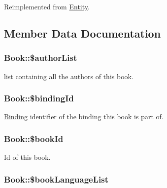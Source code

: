 Reimplemented from \hyperlink{classEntity_a48cdc3830bf695078a69a56f23e1b874}{Entity}.



\subsection{Member Data Documentation}
\hypertarget{classBook_a805fd463f7a6a7c370bd0d8aa87917e3}{
\subsubsection[{\$authorList}]{\setlength{\rightskip}{0pt plus 5cm}Book::\$authorList}}
\label{classBook_a805fd463f7a6a7c370bd0d8aa87917e3}
list containing all the authors of this book. \hypertarget{classBook_a87186d8e5f7671f3735032047c9ab5ef}{
\subsubsection[{\$bindingId}]{\setlength{\rightskip}{0pt plus 5cm}Book::\$bindingId}}
\label{classBook_a87186d8e5f7671f3735032047c9ab5ef}
\hyperlink{classBinding}{Binding} identifier of the binding this book is part of. \hypertarget{classBook_a6ba400609a6bce5ffd6dd2cf4f52de89}{
\subsubsection[{\$bookId}]{\setlength{\rightskip}{0pt plus 5cm}Book::\$bookId}}
\label{classBook_a6ba400609a6bce5ffd6dd2cf4f52de89}
Id of this book. \hypertarget{classBook_a2c4309c16fe7bbc190a11815044334fa}{
\subsubsection[{\$bookLanguageList}]{\setlength{\rightskip}{0pt plus 5cm}Book::\$bookLanguageList}}
